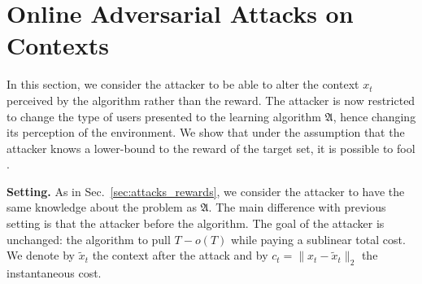 \section{Online Adversarial Attacks on Contexts}
\label{sec:attack_all_context}
In this section, we consider the attacker to be able to alter the context $x_t$ perceived by the algorithm rather than the reward. The attacker is now restricted to change the type of users presented to the learning algorithm $\mathfrak{A}$, hence changing its perception of the environment. We show that under the assumption that the attacker knows a lower-bound to the reward of the target set, it is possible to fool \linucb.

\textbf{Setting.} As in Sec.~\ref{sec:attacks_rewards}, we consider the attacker to have the same knowledge about the problem as $\mathfrak{A}$.
The main difference with  previous setting is that the attacker  before the algorithm. 
The goal of the attacker is unchanged:  the algorithm to pull  $T -o(T)$  while paying a sublinear total cost. 
We denote by $\widetilde{x}_t$ the context after the attack and by $c_t = \|x_t - \widetilde{x}_t\|_2$ the instantaneous cost.

